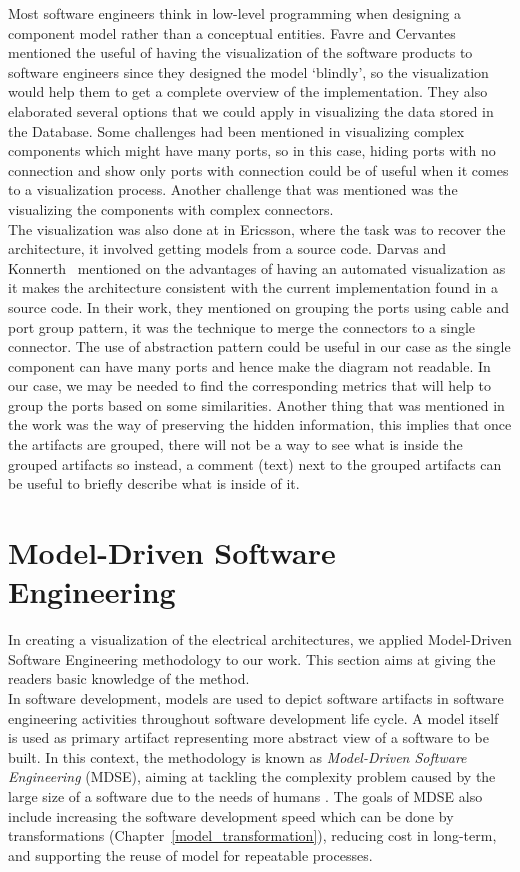 Most software engineers think in low-level programming when designing a component model rather than a conceptual entities. Favre and Cervantes mentioned the useful of having the visualization of the software products to software engineers since they designed the model `blindly', so the visualization would help them to get a complete overview of the implementation. They also elaborated several options that we could apply in visualizing the data stored in the Database. Some challenges had been mentioned in visualizing complex components which might have many ports, so in this case, hiding ports with no connection and show only ports with connection could be of useful when it comes to a visualization process. Another challenge that was mentioned was the visualizing the components with complex connectors.\\

The visualization was also done at in Ericsson, where the task was to recover the architecture, it involved getting models from a source code. Darvas and Konnerth~\cite{Adam} mentioned on the advantages of having an automated visualization as it makes the architecture consistent with the current implementation found in a source code. In their work, they mentioned on grouping the ports using cable and port group pattern, it was the technique to merge the connectors to a single connector. The use of abstraction pattern could be useful in our case as the single component can have many ports and hence make the diagram not readable. In our case, we may be needed to find the corresponding metrics that will help to group the ports based on some similarities. Another thing that was mentioned in the work was the way of preserving the hidden information, this implies that once the artifacts are grouped, there will not be a way to see what is inside the grouped artifacts so instead, a comment (text) next to the grouped artifacts can be useful to briefly describe what is inside of it.


\section{Model-Driven Software Engineering}
In creating a visualization of the electrical architectures, we applied Model-Driven Software Engineering methodology to our work. This section aims at giving the readers basic knowledge of the method.\\ 

In software development, models are used to depict software artifacts in software engineering activities throughout software development life cycle. A model itself is used as primary artifact representing more abstract view of a software to be built. In this context, the methodology is known as \textit{Model-Driven Software Engineering} (MDSE), aiming at tackling the complexity problem caused by the large size of a software due to the needs of humans \cite{Brambilla}. The goals of MDSE also include increasing the software development speed which can be done by transformations (Chapter~\ref{model_transformation}), reducing cost in long-term, and supporting the reuse of model for repeatable processes. \\


